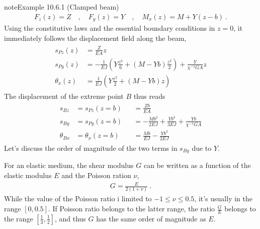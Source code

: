 \documentclass[letterpaper,10pt,english]{jupyterBook}
\begin{document}
\begin{sphinxadmonition}{note}{Example 10.6.1 (Clamped beam)}
\begin{equation*}
\begin{split}F_z(z) = Z \quad , \quad F_y(z) = Y \quad , \quad M_x(z) = M + Y ( z - b ) \ .\end{split}
\end{equation*}
\sphinxAtStartPar
Using the constitutive laws and the essential boundary conditions in \(z=0\), it immediately follows the displacement field along the beam,
\begin{equation*}
\begin{split}\begin{aligned}
  s_{Pz}(z)   & = \frac{Z}{EA} z \\
  s_{Py}(z)   & = - \frac{1}{EJ} \left( Y \frac{z^3}{6} + (M-Yb) \frac{z^2}{2} \right) + \frac{Y}{\chi^{-1} GA} z \\
  \theta_x(z) & = \frac{1}{EJ} \left( Y \frac{z^2}{2} + (M-Yb) z \right)
\end{aligned}\end{split}
\end{equation*}
\sphinxAtStartPar
The displacement of the extreme point \(B\) thus reads
\begin{equation*}
\begin{split}\begin{aligned}
  s_{Bz}      & = s_{Pz}(z=b)   && = \frac{Z b}{EA} \\
  s_{By}      & = s_{Py}(z=b)   && = -\frac{M b^2}{2 EJ} + \frac{Y b^3}{3EJ} + \frac{Y b}{\chi^{-1} GA} \\
  \theta_{Bx} & = \theta_x(z=b) && = \frac{M b}{EJ} - \frac{Y b^2}{2 EJ}
\end{aligned}\end{split}
\end{equation*}
\sphinxAtStartPar
Let’s discuss the order of magnitude of the two terms in \(s_{By}\) due to \(Y\).

\sphinxAtStartPar
{} For an elastic medium, the shear modulus \(G\) can be written as a function of the elastic modulus \(E\) and the Poisson ration \(\nu\),
\begin{equation*}
\begin{split}G = \frac{E}{2 (1 + \nu)} \ .\end{split}
\end{equation*}
\sphinxAtStartPar
While the value of the Poisson ratio i limited to \(-1 \le \nu \le 0.5\), it’s usually in the range \([0,0.5]\). If Poisson ratio belongs to the latter range, the ratio \(\frac{G}{E}\) belongs to the range \(\left[ \frac{1}{3} , \frac{1}{2} \right]\), and thus \(G\) has the same order of magnitude as \(E\).


\end{sphinxadmonition}
\end{document}
